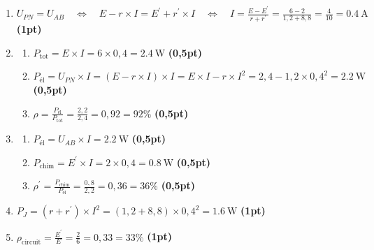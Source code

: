 \begin{enumerate}
    \item $U_{PN}=U_{AB}
          \quad\Leftrightarrow\quad
          E-r\times I=E^{\prime}+r^{\prime}\times I
          \quad\Leftrightarrow\quad
          I=\frac{E-E^{\prime}}{r+r^{\prime}}=
          \frac{6-2}{1,2+8,8}=\frac{4}{10}=\qty{0.4}{\ampere}$
          \hfill\textbf{(1pt)}

        \item
              \begin{enumerate}
                  \item $P_{\text{tot}}=E\times I=6\times0,4=\qty{2.4}{\watt}$
                        \hfill\textbf{(0,5pt)}

                  \item $P_{\text{él}}=U_{PN}\times I=(E-r\times I)\times I=
                        E\times I-r\times I^{2}=2,4-1,2\times0,4^{2}=
                        \qty{2.2}{\watt}$
                        \hfill\textbf{(0,5pt)}

                  \item $\rho=\frac{P_{\text{él}}}{P_{\text{tot}}}=
                        \frac{2,2}{2,4}=0,92=92\%$
                        \hfill\textbf{(0,5pt)}
              \end{enumerate}
    \item 
          \begin{enumerate}
              \item $P_{\text{él}}=U_{AB}\times I=\qty{2.2}{\watt}$
                    \hfill\textbf{(0,5pt)}

              \item $P_{\text{chim}}=E^{\prime}\times I=
                    2\times0,4=\qty{0.8}{\watt}$
                    \hfill\textbf{(0,5pt)}

              \item $\rho^{\prime}=\frac{P_{\text{chim}}}{P_{\text{él}}}=
                    \frac{0,8}{2,2}=0,36=36\%$
                    \hfill\textbf{(0,5pt)}
          \end{enumerate}
    \item $P_{J}=(r+r^{\prime})\times I^2=(1,2+8,8)\times0,4^2=\qty{1.6}{\watt}$
          \hfill\textbf{(1pt)}

    \item $\rho_{\text{circuit}}=\frac{E^{\prime}}{E}=
          \frac{2}{6}=0,33=33\%$
          \hfill\textbf{(1pt)}
\end{enumerate}

